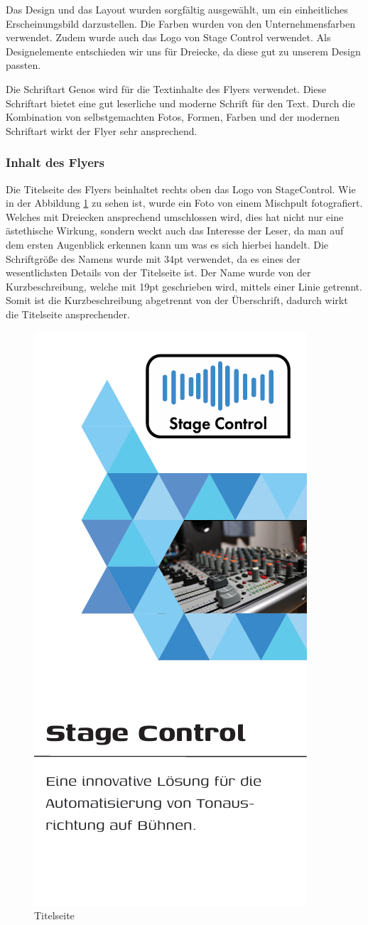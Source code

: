 Das Design und das Layout wurden sorgfältig ausgewählt, um ein einheitliches Erscheinungsbild darzustellen. Die Farben wurden von den Unternehmensfarben verwendet. Zudem wurde auch das Logo von Stage Control verwendet. Als Designelemente entschieden wir uns für Dreiecke, da diese gut zu unserem Design passten. 

Die Schriftart Genos wird für die Textinhalte des Flyers verwendet. Diese Schriftart bietet eine gut leserliche und moderne Schrift für den Text. Durch die Kombination von selbstgemachten Fotos, Formen, Farben und der modernen Schriftart wirkt der Flyer sehr ansprechend. 

\subsubsection{Inhalt des Flyers}
Die Titelseite des Flyers beinhaltet rechts oben das Logo von StageControl. Wie in der Abbildung \ref{fig:Titelseite} zu sehen ist, wurde ein Foto von einem Mischpult fotografiert. Welches mit Dreiecken ansprechend umschlossen wird, dies hat nicht nur eine ästethische Wirkung, sondern weckt auch das Interesse der Leser, da man auf dem ersten Augenblick erkennen kann um was es sich hierbei handelt. 
Die Schriftgröße des Namens wurde mit 34pt verwendet, da es eines der wesentlichsten Details von der Titelseite ist. Der Name wurde von der Kurzbeschreibung, welche mit 19pt geschrieben wird, mittels einer Linie getrennt. Somit ist die Kurzbeschreibung abgetrennt von der Überschrift, dadurch wirkt die Titelseite ansprechender.

\begin{figure}[H]
	\centering
	\includegraphics[width=0.5\linewidth]{images/Titelseite.png}
	\caption[Titelseite]{Titelseite}
	\label{fig:Titelseite}
\end{figure}

